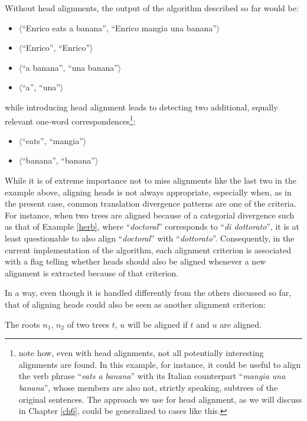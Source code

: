 \begin{example}
 Without head alignments, the output of the algorithm described so far would be:
 \begin{itemize}
 \item $\langle$``Enrico eats a banana'', ``Enrico mangia una banana''$\rangle$
 \item $\langle$``Enrico'', ``Enrico''$\rangle$
 \item $\langle$``a banana'', ``una banana''$\rangle$
 \item $\langle$``a'', ``una''$\rangle$
 \end{itemize} 
 while introducing head alignment leads to detecting two additional, equally relevant one-word correspondences\footnote{note how, even with head alignments, not all potentially interesting alignments are found. In this example, for instance, it could be useful to align the verb phrase ``\textit{eats a banana}'' with its Italian counterpart ``\textit{mangia una banana}'', whose members are also not, strictly speaking, subtrees of the original sentences. The approach we use for head alignment, as we will discuss in Chapter \ref{ch6}, could be generalized to cases like this.}:
 \begin{itemize}
 \item $\langle$``eats'', ``mangia''$\rangle$
 \item $\langle$``banana'', ``banana''$\rangle$
 \end{itemize} 
\end{example}

While it is of extreme importance not to miss alignments like the last two in the example above, aligning heads is not always appropriate, especially when, as in the present case, common translation divergence patterns are one of the criteria. For instance, when two trees are aligned because of a categorial divergence such as that of Example \ref{herb}, where ``\textit{doctoral}'' corresponds to ``\textit{di dottorato}'', it is at least questionable to also align ``\textit{doctoral}'' with ``\textit{dottorato}''. Consequently, in the current implementation of the algorithm, each alignment criterion is associated with a flag telling whether heads should also be aligned whenever a new alignment is extracted because of that criterion. \smallskip

In a way, even though it is handled differently from the others discussed so far, that of aligning heads could also be seen as another alignment criterion: \smallskip

\begin{criterion} \label{cheads}
 The roots $n_1$, $n_2$ of two trees $t$, $u$ will be aligned if $t$ and $u$ are aligned.
\end{criterion}

